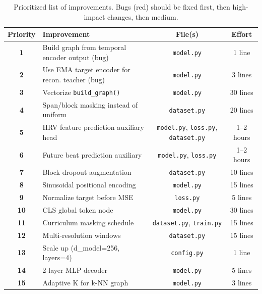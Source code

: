 \documentclass[11pt,a4paper]{article}
\newcommand{\file}[1]{\texttt{#1}}
\begin{document}
\begin{table}[h!]
\centering
\renewcommand{\arraystretch}{1.4}
\begin{tabular}{clcc}
\toprule
\textbf{Priority} & \textbf{Improvement} & \textbf{File(s)} & \textbf{Effort} \\
\midrule
\textcolor{fixred}{\textbf{1}} & Build graph from temporal encoder output (bug) & \file{model.py} & 1 line \\
\textcolor{fixred}{\textbf{2}} & Use EMA target encoder for recon. teacher (bug) & \file{model.py} & 3 lines \\
\textcolor{impacthigh}{\textbf{3}} & Vectorize \texttt{build\_graph()} & \file{model.py} & 30 lines \\
\textcolor{impacthigh}{\textbf{4}} & Span/block masking instead of uniform & \file{dataset.py} & 20 lines \\
\textcolor{impacthigh}{\textbf{5}} & HRV feature prediction auxiliary head & \file{model.py}, \file{loss.py}, \file{dataset.py} & 1--2 hours \\
\textcolor{impacthigh}{\textbf{6}} & Future beat prediction auxiliary & \file{model.py}, \file{loss.py} & 1--2 hours \\
\textcolor{impactmed}{\textbf{7}} & Block dropout augmentation & \file{dataset.py} & 10 lines \\
\textcolor{impactmed}{\textbf{8}} & Sinusoidal positional encoding & \file{model.py} & 15 lines \\
\textcolor{impactmed}{\textbf{9}} & Normalize target before MSE & \file{loss.py} & 5 lines \\
\textcolor{impactmed}{\textbf{10}} & CLS global token node & \file{model.py} & 30 lines \\
\textcolor{impactmed}{\textbf{11}} & Curriculum masking schedule & \file{dataset.py}, \file{train.py} & 15 lines \\
\textcolor{impactmed}{\textbf{12}} & Multi-resolution windows & \file{dataset.py} & 15 lines \\
\textcolor{impactlow}{\textbf{13}} & Scale up (d\_model=256, layers=4) & \file{config.py} & 1 line \\
\textcolor{impactlow}{\textbf{14}} & 2-layer MLP decoder & \file{model.py} & 5 lines \\
\textcolor{impactlow}{\textbf{15}} & Adaptive K for k-NN graph & \file{model.py} & 3 lines \\
\bottomrule
\end{tabular}
\caption{Prioritized list of improvements. Bugs (red) should be fixed first,
then high-impact changes, then medium.}
\end{table}
\end{document}
